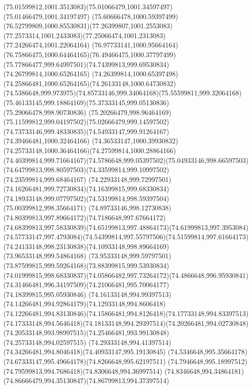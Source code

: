 {{\curveto(75.01599812,1001.3513083)(75.01066479,1001.34597497)(75.01466479,1001.34197497)
\curveto(75.60666478,1000.59397499)(76.52799809,1000.85530831)(77.26399807,1001.2553083)
\curveto(77.2573314,1001.2433083)(77.25066474,1001.2313083)(77.24266474,1001.22064164)
\curveto(76.97733141,1000.95664164)(76.75866475,1000.64464165)(76.49466475,1000.37797499)
\curveto(75.77866477,999.64997501)(74.74399813,999.69530834)(74.26799814,1000.65264165)
\curveto(74.26399814,1000.65397498)(74.25866481,1000.65264165)(74.26133148,1000.64730832)
\curveto(74.5386648,999.973975)(74.85733146,999.34064168)(75.55599811,999.32064168)
\curveto(75.46133145,999.18864169)(75.37333145,999.05130836)(75.29066478,998.90730836)
\curveto(75.20266479,998.96464169)(75.11599812,999.04197502)(75.02666479,999.14597502)
\curveto(74.73733146,999.48330835)(74.54933147,999.91264167)(74.39466481,1000.32464166)
\curveto(74.36533147,1000.39930832)(74.25733148,1000.36464166)(74.27599814,1000.28864166)
\curveto(74.40399814,999.71664167)(74.5786648,999.05397502)(75.04933146,998.66597503)
\curveto(74.64799813,998.80597503)(74.33599814,999.10997502)(74.23599814,999.68464167)
\curveto(74.22933148,999.72997501)(74.16266481,999.72730834)(74.16399815,999.68330834)
\curveto(74.18933148,999.07797502)(74.53199814,998.59397504)(75.00399812,998.35664171)
\curveto(74.89733146,998.12730838)(74.80399813,997.89664172)(74.7186648,997.67664172)
\curveto(74.68399813,997.58330839)(74.65199813,997.48864173)(74.61999813,997.3953084)
\curveto(74.57733147,997.4793084)(74.54399814,997.55797506)(74.51599814,997.61664173)
\curveto(74.24133148,998.23130838)(74.10933148,998.89664169)(73.96533148,999.54864168)
\curveto(73.95333148,999.59797501)(73.87599815,999.59264168)(73.88399815,999.53930834)
\curveto(74.01999815,998.68330837)(74.05866482,997.73264172)(74.4866648,996.95930841)
\curveto(74.31466481,996.34197509)(74.21066481,995.70064177)(74.18399815,995.05930846)
\curveto(74.16133148,994.99397513)(74.14266481,994.92864179)(74.12933148,994.8606418)
\curveto(74.12266481,994.83130846)(74.15866481,994.8126418)(74.17733148,994.83397513)
\curveto(74.17333148,994.5646418)(74.18133148,994.29397514)(74.20266481,994.02730848)
\curveto(74.20533148,993.98997515)(74.25466481,993.99130848)(74.25733148,994.02597515)
\curveto(74.29333148,994.41397514)(74.34266481,994.8046418)(74.40933147,995.19130845)
\curveto(74.5346648,995.35664178)(74.67333147,995.49664178)(74.8266648,995.62197511)
\curveto(74.7946648,995.18997512)(74.79599813,994.7686418)(74.8306648,994.36997514)
\curveto(74.8346648,994.34864181)(74.86666479,994.35130847)(74.86799813,994.37397514)
}}
